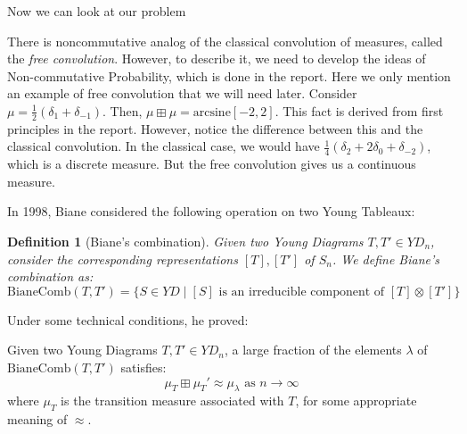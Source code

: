 \documentclass[aspectratio=169]{beamer}
\newcommand{\act}[1]{%
    \begin{frame}
    \centering
    \Huge

    {\color{purple} #1}
    \end{frame}
}
\newtheorem{defn}[theorem]{Definition}
\begin{document}
\act{Now we can look at our problem}

\begin{frame}
    There is noncommutative analog of the classical convolution of measures, called the \emph{free convolution}. \pause However, to describe it, we need to develop the ideas of Non-commutative Probability, which is done in the report. \pause
    \vskip 10pt \noindent Here we only mention an example of free convolution that we will need later. Consider $\mu = \frac{1}{2}(\delta_1 + \delta_{-1})$. Then, $\mu \boxplus \mu = \text{arcsine}[-2, 2]$. \pause This fact is derived from first principles in the report. 
    \vskip 10pt \noindent However, notice the difference between this and the classical convolution. In the classical case, we would have $\frac{1}{4}(\delta_{2} + 2\delta_0 + \delta_{-2})$, which is a discrete measure. \pause But the free convolution gives us a continuous measure.
\end{frame}

\newcommand{\biane}{\mathrm{BianeComb}}
\begin{frame}
    In 1998, Biane considered the following operation on two Young Tableaux: \pause


\begin{defn}[Biane's combination]
    Given two Young Diagrams $T, T' \in YD_n$, consider the corresponding representations $[T], [T']$ of $S_n$. We define Biane's combination as:
    \[%
        \biane(T, T') = \{S \in YD \mid [S] \text{ is an irreducible component of } [T] \otimes [T']\}
    \]
\end{defn}
\end{frame}

\begin{frame}
Under some technical conditions, he proved:

\begin{theorem}
    Given two Young Diagrams $T, T' \in YD_n$, a large fraction of the elements $\lambda$ of $\biane(T, T')$ satisfies:
    \[%
        \mu_T \boxplus \mu_T' \approx \mu_\lambda \text{ as $n \to \infty$}
    \]
    where $\mu_T$ is the transition measure associated with $T$, for some appropriate meaning of $\approx$. 
\end{theorem}
\end{frame}
\end{document}
